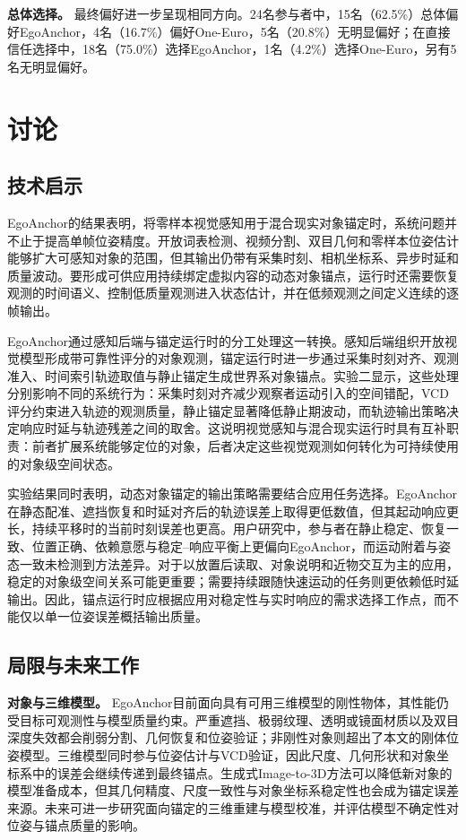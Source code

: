\documentclass[review]{vgtc}
\begin{document}
\textbf{总体选择。}
最终偏好进一步呈现相同方向。24名参与者中，15名（62.5\%）总体偏好EgoAnchor，4名（16.7\%）偏好One-Euro，5名（20.8\%）无明显偏好；在直接信任选择中，18名（75.0\%）选择EgoAnchor，1名（4.2\%）选择One-Euro，另有5名无明显偏好。

\section{讨论}\label{sec:discussion}

\subsection{技术启示}

EgoAnchor的结果表明，将零样本视觉感知用于混合现实对象锚定时，系统问题并不止于提高单帧位姿精度。开放词表检测、视频分割、双目几何和零样本位姿估计能够扩大可感知对象的范围，但其输出仍带有采集时刻、相机坐标系、异步时延和质量波动。要形成可供应用持续绑定虚拟内容的动态对象锚点，运行时还需要恢复观测的时间语义、控制低质量观测进入状态估计，并在低频观测之间定义连续的逐帧输出。

EgoAnchor通过感知后端与锚定运行时的分工处理这一转换。感知后端组织开放视觉模型形成带可靠性评分的对象观测，锚定运行时进一步通过采集时刻对齐、观测准入、时间索引轨迹取值与静止锚定生成世界系对象锚点。实验二显示，这些处理分别影响不同的系统行为：采集时刻对齐减少观察者运动引入的空间错配，VCD评分约束进入轨迹的观测质量，静止锚定显著降低静止期波动，而轨迹输出策略决定响应时延与轨迹残差之间的取舍。这说明视觉感知与混合现实运行时具有互补职责：前者扩展系统能够定位的对象，后者决定这些视觉观测如何转化为可持续使用的对象级空间状态。

实验结果同时表明，动态对象锚定的输出策略需要结合应用任务选择。EgoAnchor在静态配准、遮挡恢复和时延对齐后的轨迹误差上取得更低数值，但其起动响应更长，持续平移时的当前时刻误差也更高。用户研究中，参与者在静止稳定、恢复一致、位置正确、依赖意愿与稳定--响应平衡上更偏向EgoAnchor，而运动附着与姿态一致未检测到方法差异。对于以放置后读取、对象说明和近物交互为主的应用，稳定的对象级空间关系可能更重要；需要持续跟随快速运动的任务则更依赖低时延输出。因此，锚点运行时应根据应用对稳定性与实时响应的需求选择工作点，而不能仅以单一位姿误差概括输出质量。

\subsection{局限与未来工作}

\textbf{对象与三维模型。}
EgoAnchor目前面向具有可用三维模型的刚性物体，其性能仍受目标可观测性与模型质量约束。严重遮挡、极弱纹理、透明或镜面材质以及双目深度失效都会削弱分割、几何恢复和位姿验证；非刚性对象则超出了本文的刚体位姿模型。三维模型同时参与位姿估计与VCD验证，因此尺度、几何形状和对象坐标系中的误差会继续传递到最终锚点。生成式Image-to-3D方法可以降低新对象的模型准备成本，但其几何精度、尺度一致性与对象坐标系稳定性也会成为锚定误差来源。未来可进一步研究面向锚定的三维重建与模型校准，并评估模型不确定性对位姿与锚点质量的影响。
\end{document}
